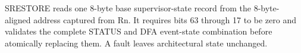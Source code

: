 SRESTORE reads one 8-byte base supervisor-state record from the 8-byte-aligned address captured from Rn. It requires bits 63 through 17 to be zero and validates the complete STATUS and DFA event-state combination before atomically replacing them. A fault leaves architectural state unchanged.
